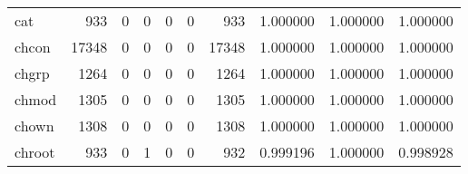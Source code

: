 \begin{longtable}{lrrrrrrrrr}
cat       &                                 933 &                                               0 &                                              0 &                                             0 &                                              0 &                                          933 &                                           1.000000 &                               1.000000 &                             1.000000 \\
chcon     &                               17348 &                                               0 &                                              0 &                                             0 &                                              0 &                                        17348 &                                           1.000000 &                               1.000000 &                             1.000000 \\
chgrp     &                                1264 &                                               0 &                                              0 &                                             0 &                                              0 &                                         1264 &                                           1.000000 &                               1.000000 &                             1.000000 \\
chmod     &                                1305 &                                               0 &                                              0 &                                             0 &                                              0 &                                         1305 &                                           1.000000 &                               1.000000 &                             1.000000 \\
chown     &                                1308 &                                               0 &                                              0 &                                             0 &                                              0 &                                         1308 &                                           1.000000 &                               1.000000 &                             1.000000 \\
chroot    &                                 933 &                                               0 &                                              1 &                                             0 &                                              0 &                                          932 &                                           0.999196 &                               1.000000 &                             0.998928 \\

\end{longtable}
